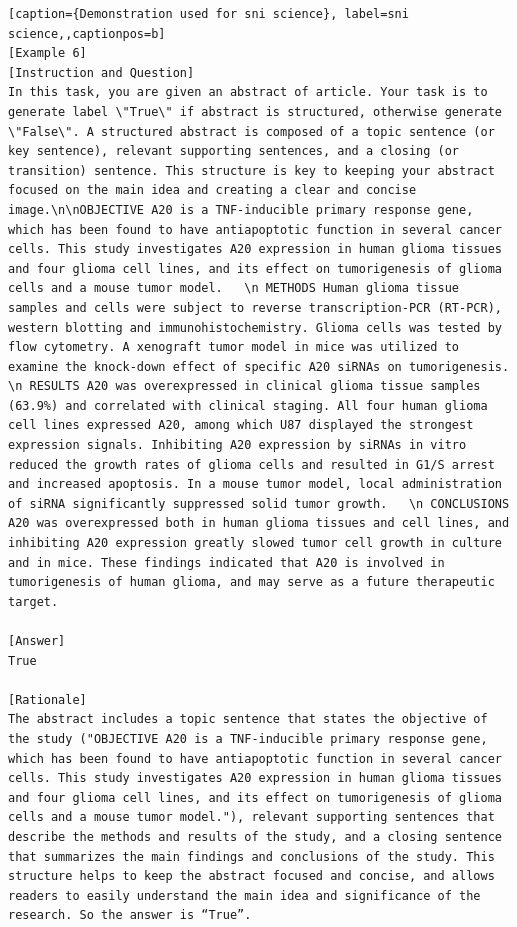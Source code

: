 \begin{lstlisting}[caption={Demonstration used for sni science}, label=sni science,,captionpos=b]
[Example 6]
[Instruction and Question]
In this task, you are given an abstract of article. Your task is to generate label \"True\" if abstract is structured, otherwise generate \"False\". A structured abstract is composed of a topic sentence (or key sentence), relevant supporting sentences, and a closing (or transition) sentence. This structure is key to keeping your abstract focused on the main idea and creating a clear and concise image.\n\nOBJECTIVE A20 is a TNF-inducible primary response gene, which has been found to have antiapoptotic function in several cancer cells. This study investigates A20 expression in human glioma tissues and four glioma cell lines, and its effect on tumorigenesis of glioma cells and a mouse tumor model.   \n METHODS Human glioma tissue samples and cells were subject to reverse transcription-PCR (RT-PCR), western blotting and immunohistochemistry. Glioma cells was tested by flow cytometry. A xenograft tumor model in mice was utilized to examine the knock-down effect of specific A20 siRNAs on tumorigenesis.   \n RESULTS A20 was overexpressed in clinical glioma tissue samples (63.9%) and correlated with clinical staging. All four human glioma cell lines expressed A20, among which U87 displayed the strongest expression signals. Inhibiting A20 expression by siRNAs in vitro reduced the growth rates of glioma cells and resulted in G1/S arrest and increased apoptosis. In a mouse tumor model, local administration of siRNA significantly suppressed solid tumor growth.   \n CONCLUSIONS A20 was overexpressed both in human glioma tissues and cell lines, and inhibiting A20 expression greatly slowed tumor cell growth in culture and in mice. These findings indicated that A20 is involved in tumorigenesis of human glioma, and may serve as a future therapeutic target.

[Answer]
True

[Rationale]
The abstract includes a topic sentence that states the objective of the study ("OBJECTIVE A20 is a TNF-inducible primary response gene, which has been found to have antiapoptotic function in several cancer cells. This study investigates A20 expression in human glioma tissues and four glioma cell lines, and its effect on tumorigenesis of glioma cells and a mouse tumor model."), relevant supporting sentences that describe the methods and results of the study, and a closing sentence that summarizes the main findings and conclusions of the study. This structure helps to keep the abstract focused and concise, and allows readers to easily understand the main idea and significance of the research. So the answer is “True”.




\end{lstlisting}
